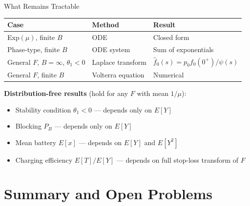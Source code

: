 \documentclass[aspectratio=169]{beamer}
\newcommand{\E}[1]{E\left[#1\right]}
\begin{document}
\begin{frame}{What Remains Tractable}

  \renewcommand{\arraystretch}{1.5}
  \begin{tabular}{lll}
    \toprule
    Case & Method & Result \\
    \midrule
    Exp$(\mu)$, finite $B$ & ODE & Closed form \\
    Phase-type, finite $B$ & ODE system & Sum of exponentials \\
    General $F$, $B=\infty$, $\theta_1<0$ & Laplace transform &
      $\hat{f}_0(s) = p_0 f_0(0^+)/\psi(s)$ \\
    General $F$, finite $B$ & Volterra equation & Numerical \\
    \bottomrule
  \end{tabular}

  \bigskip
  \textbf{Distribution-free results} (hold for any $F$ with mean $1/\mu$):
  \begin{itemize}
    \setlength\itemsep{0.4em}
    \item Stability condition $\theta_1 < 0$ — depends only on $\E{Y}$
    \item Blocking $P_B$ — depends only on $\E{Y}$
    \item Mean battery $\E{x}$ — depends on $\E{Y}$ and $\E{Y^2}$
    \item Charging efficiency $\E{T}/\E{Y}$ — depends on full stop-loss transform of $F$
  \end{itemize}

\end{frame}

\section{Summary and Open Problems}
\end{document}
